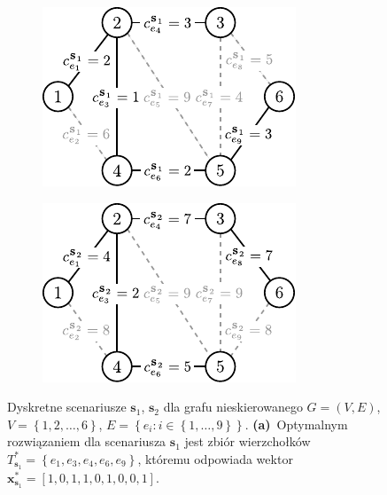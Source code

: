 \begin{figure}[!htbp]
	\null\hfill
	\begin{subfigure}[b]{0.35\textwidth}
		\includegraphics[width=\textwidth]{Chapter_II/MIN-MAX-REG-example/a}
		\caption{}
		\label{fig:minmaxregexample:a}
	\end{subfigure}
	\hfill
	\begin{subfigure}[b]{0.35\textwidth}
		\includegraphics[width=\textwidth]{Chapter_II/MIN-MAX-REG-example/b}
		\caption{}
		\label{fig:minmaxregexample:b}
	\end{subfigure}
	\hfill\null
	\caption{
		Dyskretne scenariusze $\textbf{s}_{1}$, $\textbf{s}_{2}$ dla grafu nieskierowanego $G = \left( V, E \right)$, $V = \left\{ 1, 2, \dots, 6 \right\}$, $E = \left\{ e_{i} : i \in \left\{ 1, \dots, 9 \right\} \right\}$.
		\textbf{(a)}~Optymalnym rozwiązaniem dla scenariusza $\textbf{s}_{1}$ jest zbiór wierzchołków $T^{\ast}_{\textbf{s}_{1}} = \left\{ e_{1}, e_{3}, e_{4}, e_{6}, e_{9} \right\}$, któremu odpowiada wektor $\textbf{x}^{\ast}_{\textbf{s}_{1}} = \left[ 1, 0, 1, 1, 0, 1, 0, 0, 1 \right]$.
}
\end{figure}
